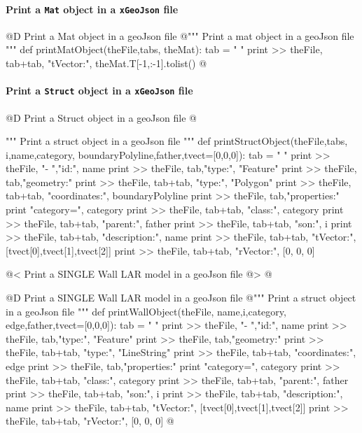\documentclass[11pt,oneside]{article}    %
\begin{document}
\paragraph{Print a \texttt{Mat} object in a \texttt{xGeoJson} file}

@D Print a Mat object in a geoJson file
@{""" Print a mat object in a geoJson file """
def printMatObject(theFile,tabs, theMat):
    tab = "    "
    print >> theFile, tab+tab, "tVector:", theMat.T[-1,:-1].tolist()
@}

\paragraph{Print a \texttt{Struct} object in a \texttt{xGeoJson} file}

@D Print a Struct object in a geoJson file
@{""" Print a struct object in a geoJson file """
def printStructObject(theFile,tabs, i,name,category, boundaryPolyline,father,tvect=[0,0,0]):
    tab = "    "
    print >> theFile, "-   ","id:", name
    print >> theFile, tab,"type:", "Feature"
    print >> theFile, tab,"geometry:" 
    print >> theFile, tab+tab, "type:", "Polygon"
    print >> theFile, tab+tab, "coordinates:", boundaryPolyline
    print >> theFile, tab,"properties:"
    print "category=", category
    print >> theFile, tab+tab, "class:", category
    print >> theFile, tab+tab, "parent:", father
    print >> theFile, tab+tab, "son:", i
    print >> theFile, tab+tab, "description:", name
    print >> theFile, tab+tab, "tVector:", [tvect[0],tvect[1],tvect[2]]
    print >> theFile, tab+tab, "rVector:", [0, 0, 0]
    
@< Print a SINGLE Wall LAR model  in a geoJson file @>
@}

@D Print a SINGLE Wall LAR model  in a geoJson file
@{""" Print a struct object in a geoJson file """
def printWallObject(theFile, name,i,category, edge,father,tvect=[0,0,0]):
    tab = "    "
    print >> theFile, "-   ","id:", name
    print >> theFile, tab,"type:", "Feature"
    print >> theFile, tab,"geometry:" 
    print >> theFile, tab+tab, "type:", "LineString"
    print >> theFile, tab+tab, "coordinates:", edge
    print >> theFile, tab,"properties:"
    print "category=", category
    print >> theFile, tab+tab, "class:", category
    print >> theFile, tab+tab, "parent:", father
    print >> theFile, tab+tab, "son:", i
    print >> theFile, tab+tab, "description:", name
    print >> theFile, tab+tab, "tVector:", [tvect[0],tvect[1],tvect[2]]
    print >> theFile, tab+tab, "rVector:", [0, 0, 0]
@}
\end{document}
